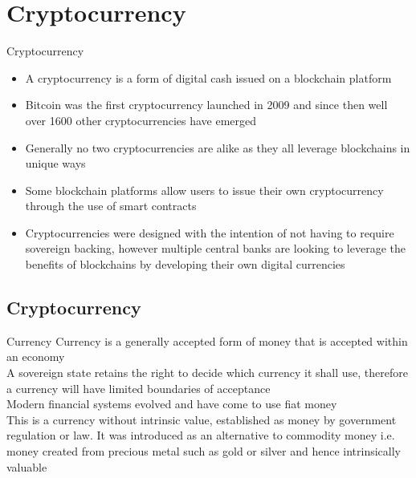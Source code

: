 \documentclass[10pt]{beamer}
\begin{document}

\section{Cryptocurrency}

\begin{frame}
	\begin{center}
		\begin{large}
			Cryptocurrency
		\end{large}
	\end{center}
\end{frame}



\begin{frame}{}
	\begin{itemize}
		\item A cryptocurrency is a form of digital cash issued on a blockchain platform
		\item Bitcoin was the first cryptocurrency launched in 2009 and since then well over 1600 other cryptocurrencies have emerged
		\item Generally no two cryptocurrencies are alike as they all leverage blockchains in unique ways
		\item Some blockchain platforms allow users to issue their own cryptocurrency through the use of smart contracts
		\item Cryptocurrencies were designed with the intention of not having to require sovereign backing, however multiple central banks are looking to leverage the benefits of blockchains by developing their own digital currencies
	\end{itemize}
\end{frame}


\subsection{Cryptocurrency}

\begin{frame}{Currency}
	Currency is a generally accepted form of money that is accepted within an economy\\ \vspace{3mm}
	A sovereign state retains the right to decide which currency it shall use, therefore a currency will have limited boundaries of acceptance \\ \vspace{3mm}
	Modern financial systems evolved and have come to use fiat money\\ \vspace{3mm}
	This is a currency without intrinsic value, established as money by government regulation or law. It was introduced as an alternative to commodity money i.e. money created from precious metal such as gold or silver and hence intrinsically valuable
\end{frame}
\end{document}
